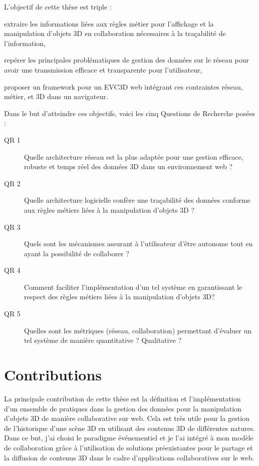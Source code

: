 L'objectif de cette thèse est triple : 
\begin{enumerate*}[label=(\roman*)]
	\item extraire les informations liées aux règles métier pour l'affichage et la 
	manipulation d'objets \gls{3D} en collaboration nécessaires à la traçabilité de 
	l'information,
	\item repérer les principales problématiques de gestion des données sur le 
	réseau pour avoir une transmission efficace et transparente pour l'utilisateur,
	\item proposer un \gls{framework} pour un \gls{EVC3D} web intégrant ces 
	contraintes réseau, métier, et \gls{3D} dans un navigateur.
\end{enumerate*}
Dans le but d'atteindre ces objectifs, voici les cinq Questions de Recherche 
posées :
\begin{description}
	\item[QR 1] Quelle architecture réseau est la plus adaptée pour une gestion 
	efficace, robuste et temps réel des données \gls{3D} dans un environnement 
	web ?
	
	\item[QR 2] Quelle architecture logicielle confère une traçabilité des données 
	conforme aux règles métiers liées à la manipulation d'objets \gls{3D} ? 
	
	\item[QR 3] Quels sont les mécanismes assurant à l'utilisateur d'être 
	autonome tout en ayant la possibilité de collaborer ?
	
	
	\item[QR 4] Comment faciliter l'implémentation d'un tel système en garantissant 
	le respect des règles métiers liées à la manipulation d'objets \gls{3D}?
	
	\item[QR 5] Quelles sont les métriques (réseau, collaboration) permettant 
	d'évaluer un tel système de manière quantitative ? Qualitative ? %
	
\end{description}

\section{Contributions}

La principale contribution de cette thèse est la définition et l'implémentation d'un 
ensemble de pratiques dans la gestion des données pour la manipulation d'objets 
3D de manière collaborative sur web. Cela est très utile pour la gestion de 
l'historique d'une scène \gls{3D} en utilisant des contenus \gls{3D} de différentes 
natures. Dans ce but, j'ai choisi le paradigme événementiel et je l'ai 
intégré à mon modèle de collaboration grâce à l'utilisation de solutions 
préexistantes pour le partage et la diffusion de contenus \gls{3D} dans le cadre 
d'applications collaboratives sur le web.

